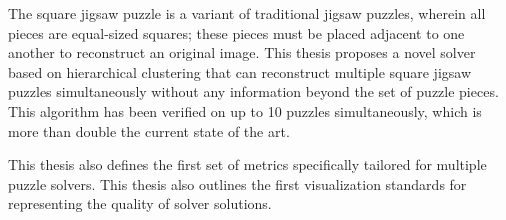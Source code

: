 The square jigsaw puzzle is a variant of traditional jigsaw puzzles, wherein all pieces are equal-sized squares; these pieces must be placed adjacent to one another to reconstruct an original image.  This thesis proposes a novel solver based on hierarchical clustering that can reconstruct multiple square jigsaw puzzles simultaneously without any information beyond the set of puzzle pieces.  This algorithm has been verified on up to 10 puzzles simultaneously, which is more than double the current state of the art.

This thesis also defines the first set of metrics specifically tailored for multiple puzzle solvers.  This thesis also outlines the first visualization standards for representing the quality of solver solutions.
